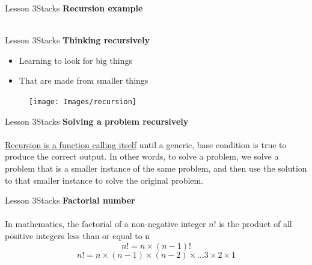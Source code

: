\documentclass[aspectratio=1610]{beamer}
\begin{document}
\begin{frame}{Lesson 3}{Stacks}
\Large
\textbf{Recursion example}\\~\\
\label{personCount}
\begin{algorithmic}[1]
    \State {}
    \State {}    
\EndIf
\EndProcedure
\end{algorithmic}
\end{frame}



\begin{frame}{Lesson 3}{Stacks}
{\LARGE\textbf{{Thinking recursively}}}
\Large
\begin{minipage}{0.60\textwidth}
    \begin{itemize}
      \item Learning to look for big things 
      \item That are made from smaller things
    \end{itemize}
  \end{minipage}
\begin{minipage}{.0\textwidth}
      \begin{figure}
        \texttt{[image: Images/recursion]}
      \end{figure}
  \end{minipage}  
\end{frame}



\begin{frame}{Lesson 3}{Stacks}
\LARGE
\textbf{Solving a problem recursively}\\~\\
\underline{Recursion is a function calling itself} until a generic,
base condition is true to produce the correct output. In other 
words, to solve a problem, we solve a problem that is a smaller
instance of the same problem, and then use the solution to that
smaller instance to solve the original problem.
\end{frame}



\begin{frame}{Lesson 3}{Stacks}
\LARGE
\textbf{Factorial number}\\~\\
In mathematics, the factorial of a non-negative integer 
$n!$ is the product of all positive integers less than or equal to n
\begin{equation}
n!=n \times (n-1)!
\end{equation}
\begin{equation}
n! = n \times (n-1) \times (n-2) \times \dots 3 \times 2 \times 1
\end{equation}
\end{frame}
\end{document}
